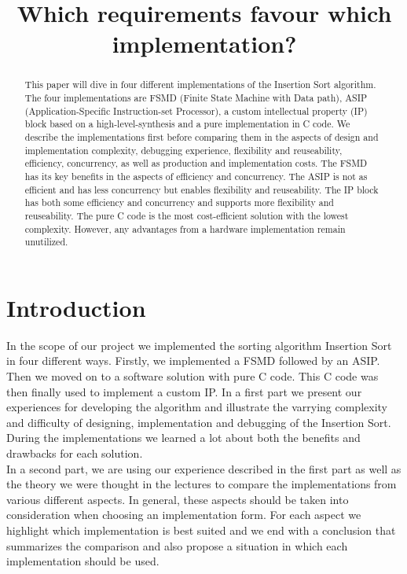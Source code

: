 \documentclass[conference]{IEEEtran}
\begin{document}
\title{Which requirements favour which implementation? \\}

\maketitle

\begin{abstract}
This paper will dive in four different implementations of the Insertion Sort algorithm. The four implementations are FSMD (Finite State Machine with Data path), ASIP (Application-Specific Instruction-set Processor), a custom intellectual property (IP) block based on a high-level-synthesis and a pure implementation in C code. We describe the implementations first before comparing them in the aspects of design and implementation complexity, debugging experience, flexibility and reuseability, efficiency, concurrency, as well as production and implementation costs. The FSMD has its key benefits in the aspects of efficiency and concurrency. The ASIP is not as efficient and has less concurrency but enables flexibility and reuseability. The IP block has both some efficiency and concurrency and supports more flexibility and reuseability. The pure C code is the most cost-efficient solution with the lowest complexity. However, any advantages from a hardware implementation remain unutilized.
\end{abstract}

\section{Introduction}
In the scope of our project we implemented the sorting algorithm Insertion Sort in four different ways. Firstly, we implemented a FSMD followed by an ASIP. Then we moved on to a software solution with pure C code. This C code was then finally used to implement a custom IP. In a first part we present our experiences for developing the algorithm and illustrate the varrying complexity and difficulty of designing, implementation and debugging of the Insertion Sort. During the implementations we learned a lot about both the benefits and drawbacks for each solution.\\
In a second part, we are using our experience described in the first part as well as the theory we were thought in the lectures to compare the implementations from various different aspects. In general, these aspects should be taken into consideration when choosing an implementation form. For each aspect we highlight which implementation is best suited and we end with a conclusion that summarizes the comparison and also propose a situation in which each implementation should be used.
\end{document}
